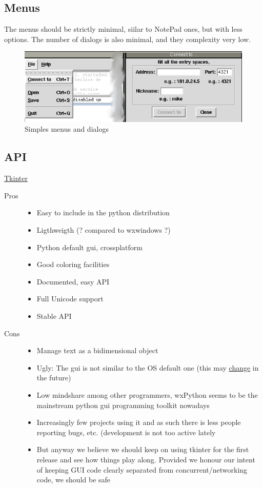 \documentclass{article}
\begin{document}
\subsection{Menus}

The menus should be strictly minimal, siilar to NotePad ones, but with less options.
The number of dialogs is also minimal, and they complexity very low.


\begin{figure}[htbp]
 \begin{center}
    \includegraphics[angle=0,width=0.5\linewidth]{schemas/simples_menus_and_dialogs.png}
 \end{center}
 \label{fig:simplesmenusanddialogs}
 \caption{Simples menus and dialogs}
\end{figure}


\subsection{API}

\href{http://www.python.org/topics/tkinter/}{Tkinter}

\begin{description}
\item [Pros]
    \begin{itemize}
    \item Easy to include in the python distribution
    \item Ligthweigth (? compared to wxwindows ?)
    \item Python default gui, crossplatform
    \item Good coloring facilities
    \item Documented, easy API
    \item Full Unicode support
    \item Stable API
    \end{itemize}

\item [Cons]
    \begin{itemize}
    \item Manage text as a bidimensional object
    \item Ugly: The gui is not similar to the OS default one (this may \href{http://tcl.projectforum.com/tk/47}{change} in the future)
    \item Low mindshare among other programmers, wxPython seems to be the mainstream python gui programming toolkit nowadays
    \item Increasingly few projects using it and as such there is less people reporting bugs, etc. (development is not too active lately
    \item But anyway we believe we should keep on using tkinter for the first release and see how things play along. Provided we honour our intent of keeping GUI code clearly separated from concurrent/networking code, we should be safe
    \end{itemize}
\end{description}
\end{document}
